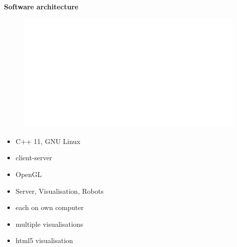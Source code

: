 \documentclass[xcolor=dvipsnames]{beamer}
\begin{document}
\begin{frame}{\bf Software architecture}

\begin{figure}[!htb]
\centering
\includegraphics[scale=.3]{../diagrams/aeris_software_block_inv.png}
\end{figure}


\begin{minipage}{.5\textwidth}


\begin{itemize}
  \item C++ 11, GNU Linux
  \item client-server
  \item OpenGL
\end{itemize}

  \end{minipage}%
\begin{minipage}{.5\textwidth}

  \begin{itemize}
    \item Server, Visualisation, Robots
    \item each on own computer
    \item multiple visualisations
    \item html5 visualisation
  \end{itemize}

\end{minipage}


\end{frame}
\end{document}
